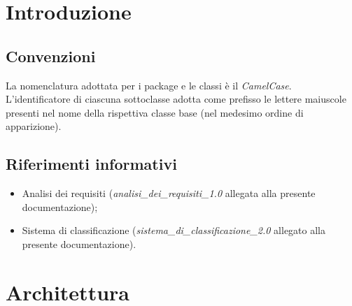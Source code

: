 \documentclass[10pt,a4paper,headinclude,footinclude,hidelinks]{scrreprt} %
\begin{document}
	\chapter{Introduzione}
	\label{ch:stage:design:intro}



	\section{Convenzioni}
	La nomenclatura adottata per i package e le classi è il \textit{CamelCase}.	L'identificatore di ciascuna sottoclasse adotta come prefisso le lettere maiuscole presenti nel nome della rispettiva classe base (nel medesimo ordine di apparizione). 

	\section{Riferimenti informativi}
	\begin{itemize}
	\item Analisi dei requisiti (\textit{analisi\_dei\_requisiti\_1.0} allegata alla presente documentazione);
	\item Sistema di classificazione (\textit{sistema\_di\_classificazione\_2.0} allegato alla presente documentazione).
	\end{itemize}

	\chapter{Architettura}
	\label{ch:stage:design:architettura}
\end{document}
